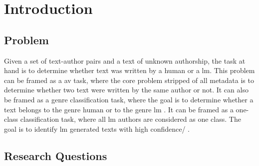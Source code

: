 \chapter{Introduction}
\label{chap:introduction}

\section{Problem}
\label{sec:problem}

Given a set of text-author pairs and a text of unknown authorship, 
the task at hand is to determine whether text was written by a human or a \ac{lm}.
This problem can be framed as a \ac{av} task, where the core problem stripped of all metadata 
is to determine whether two text were written by the same author or not.
It can also be framed as a genre classification task, where the goal is to determine whether a text belongs 
to the genre human or to the genre \ac{lm} .
It can be framed as a one-class classification task, where all \ac{lm} authors are considered as one class.
The goal is to identify \ac{lm} generated texts with high confidence/ .

\section{Research Questions}
\label{sec:research_questions}

